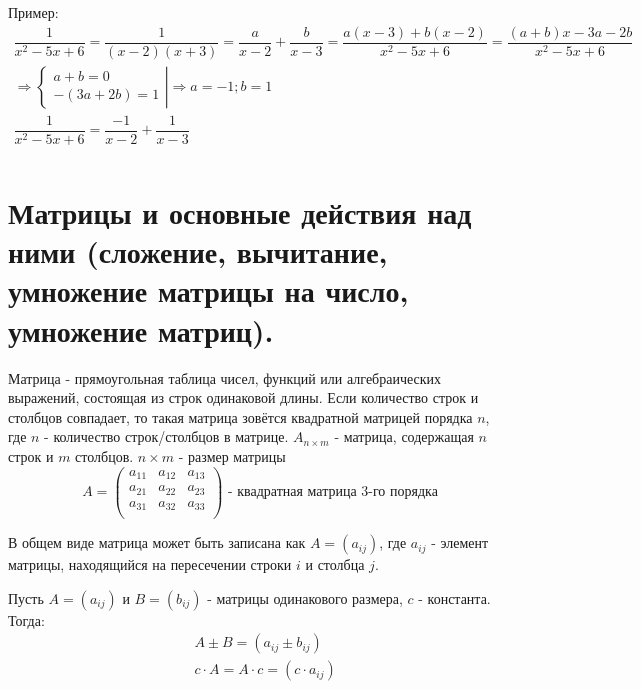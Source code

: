 \documentclass[12pt]{article}
\begin{document}
\begin{sloppypar}
    Пример:
    \[
        \begin{array}{l}
            \dfrac{1}{x^2 - 5x + 6} = \dfrac{1}{(x-2)(x+3)} = \dfrac{a}{x - 2} + \dfrac{b}{x-3} = \dfrac{a(x - 3) + b(x-2)}{x^2 - 5x + 6} = \dfrac{(a + b)x - 3a - 2b}{x^2 - 5x + 6} \\
            \Rightarrow \left.\begin{cases}
                                  a + b = 0 \\
                                  -(3a + 2b) = 1
                              \end{cases}\right|
            \Rightarrow a = -1; b = 1                                                                                                                                                \\
            \dfrac{1}{x^2 - 5x + 6} = \dfrac{-1}{x - 2} + \dfrac{1}{x - 3}                                                                                                           \\
        \end{array}
    \]

    \section{Матрицы и основные действия над ними (сложение, вычитание, умножение матрицы на число, умножение матриц).}
    Матрица - прямоугольная таблица чисел, функций или алгебраических выражений, состоящая из строк одинаковой длины. Если количество строк и столбцов совпадает, то такая матрица зовётся квадратной матрицей порядка $n$, где $n$ - количество строк/столбцов в матрице. $A_{n\times m}$ - матрица, содержащая $n$ строк и $m$ столбцов. $n \times m$ - размер матрицы
    \[
        A = \begin{pmatrix}
            a_{11} & a_{12} & a_{13} \\
            a_{21} & a_{22} & a_{23} \\
            a_{31} & a_{32} & a_{33} \\
        \end{pmatrix}
        \text{ - квадратная матрица 3-го порядка}
    \]

    В общем виде матрица может быть записана как $A = \left(a_{ij}\right)$, где $a_{ij}$ - элемент матрицы, находящийся на пересечении строки $i$ и столбца $j$.

    Пусть $A = \left(a_{ij}\right)$ и $B = \left(b_{ij}\right)$ - матрицы одинакового размера, $c$ - константа. Тогда:
    \begin{align*}
         & A \pm B = \left(a_{ij} \pm b_{ij}\right)         \\
         & c\cdot A = A\cdot c = \left(c\cdot a_{ij}\right)
    \end{align*}


\end{sloppypar}
\end{document}
